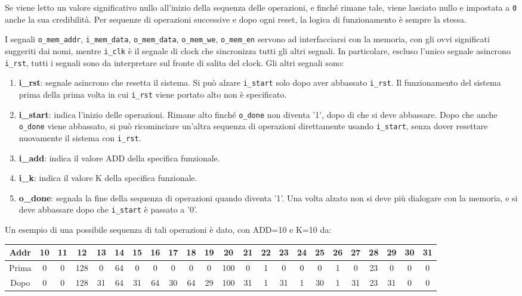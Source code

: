 \documentclass{article}
\begin{document}
Se viene letto un valore significativo nullo all’inizio della sequenza delle operazioni, e finché rimane tale, viene lasciato nullo e impostata a \texttt{0} anche la sua credibilità. Per sequenze di operazioni successive e dopo ogni reset, la logica di funzionamento è sempre la stessa.

I segnali \texttt{o\_mem\_addr}, \texttt{i\_mem\_data}, \texttt{o\_mem\_data}, \texttt{o\_mem\_we}, \texttt{o\_mem\_en} servono ad interfacciarsi con la memoria, con gli ovvi significati suggeriti dai nomi, mentre \texttt{i\_clk} è il segnale di clock che sincronizza tutti gli altri segnali. In particolare, escluso l’unico segnale asincrono \texttt{i\_rst}, tutti i segnali sono da interpretare sul fronte di salita del clock. Gli altri segnali sono:


\begin{enumerate}
    \item \textbf{i\_rst}: segnale asincrono che resetta il sistema. Si può alzare \texttt{i\_start} solo dopo aver abbassato \texttt{i\_rst}. Il funzionamento del sistema prima della prima volta in cui \texttt{i\_rst} viene portato alto non è specificato.
    \item \textbf{i\_start}: indica l’inizio delle operazioni. Rimane alto finché \texttt{o\_done} non diventa '1', dopo di che si deve abbassare. Dopo che anche \texttt{o\_done} viene abbassato, si può ricominciare un’altra sequenza di operazioni direttamente usando \texttt{i\_start}, senza dover resettare nuovamente il sistema con \texttt{i\_rst}.
    \item \textbf{i\_add}: indica il valore ADD della specifica funzionale.
    \item \textbf{i\_k}: indica il valore K della specifica funzionale.
    \item \textbf{o\_done}: segnala  la fine della sequenza di operazioni quando diventa '1'. Una volta alzato non si deve più dialogare con la memoria, e si deve abbassare dopo che \texttt{i\_start} è passato a '0'.
\end{enumerate}

Un esempio di una possibile sequenza di tali operazioni è dato, con ADD=10 e K=10 da: 

\begin{table}[htbp]
    \begin{adjustwidth}{-1.cm}{}
    \centering
    \begin{tabular}{|c|c|c|c|c|c|c|c|c|c|c|c|c|c|c|c|c|c|c|c|c|c|c|}
        \hline
        Addr & 10 & 11 & 12 & 13 & 14 & 15 & 16 & 17 & 18 & 19 & 20 & 21 & 22 & 23 & 24 & 25 & 26 & 27 & 28 & 29 & 30 & 31 \\
        \hline
        Prima & 0 & 0 & 128 & 0 & 64 & 0 & 0 & 0 & 0 & 0 & 100 & 0 & 1 & 0 & 0 & 0 & 1 & 0 & 23 & 0 & 0 & 0 \\
        Dopo & 0 & 0 & 128 & 31 & 64 & 31 & 64 & 30 & 64 & 29 & 100 & 31 & 1 & 31 & 1 & 30 & 1 & 31 & 23 & 31 & 0 & 0 \\
        \hline
    \end{tabular}
    \end{adjustwidth}
\end{table}
\end{document}
